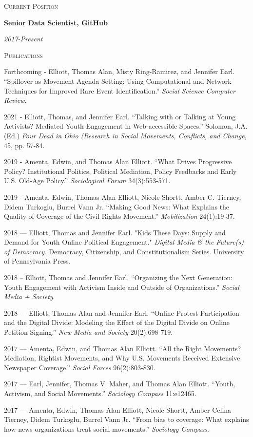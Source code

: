 \documentclass[11pt]{article}
\newcommand{\sectionheader}[1]{
{\Large
\textsc{#1}}
}
\newcommand{\resumeitem}[2]{
\begin{minipage}{0.7\textwidth}
\begin{flushleft}
\textbf{#1}
\end{flushleft}
\end{minipage}
\begin{minipage}{0.3\textwidth}
\begin{flushright}
\emph{#2}
\end{flushright}
\end{minipage}
\hangindent=0.05\textwidth
}
\begin{document}
\sectionheader{Current Position}

\resumeitem{Senior Data Scientist, GitHub}{2017-Present}


\sectionheader{Publications}

Forthcoming - Elliott, Thomas Alan, Misty Ring-Ramirez, and Jennifer Earl. ``Spillover as Movement Agenda Setting: Using Computational and Network Techniques for Improved Rare Event Identification.'' \textit{Social Science Computer Review}.

2021 - Elliott, Thomas, and Jennifer Earl. ``Talking with or Talking at Young Activists? Mediated Youth Engagement in Web-accessible Spaces.'' Solomon, J.A. (Ed.) \textit{Four Dead in Ohio (Research in Social Movements, Conflicts, and Change}, 45, pp. 57-84.

2019 - Amenta, Edwin, and Thomas Alan Elliott. ``What Drives Progressive Policy? Institutional Politics, Political Mediation, Policy Feedbacks and Early U.S. Old-Age Policy.'' \textit{Sociological Forum} 34(3):553-571. 

2019 - Amenta, Edwin, Thomas Alan Elliott, Nicole Shortt, Amber C. Tierney, Didem Turkoglu, Burrel Vann Jr. ``Making Good News: What Explains the Quality of Coverage of the Civil Rights Movement.'' \textit{Mobilization} 24(1):19-37.

2018 --- Elliott, Thomas and Jennifer Earl. "Kids These Days: Supply and Demand for Youth Online Political Engagement." \textit{Digital Media \& the Future(s) of Democracy.} Democracy, Citizenship, and Constitutionalism Series. University of Pennsylvania Press.

2018 -- Elliott, Thomas and Jennifer Earl. ``Organizing the Next Generation: Youth Engagement with Activism Inside and Outside of Organizations.'' \textit{Social Media + Society}.

2018 --- Elliott, Thomas Alan and Jennifer Earl. ``Online Protest Participation and the Digital Divide: Modeling the Effect of the Digital Divide on Online Petition Signing.'' \textit{New Media and Society} 20(2):698-719.

2017 --- Amenta, Edwin, and Thomas Alan Elliott. ``All the Right Movements?
Mediation, Rightist Movements, and Why U.S. Movements Received Extensive Newspaper Coverage.'' \textit{Social Forces} 96(2):803-830. 

2017 --- Earl, Jennifer, Thomas V. Maher, and Thomas Alan Elliott. ``Youth, Activism, and Social Movements.'' \textit{Sociology Compass} 11:e12465.

2017 --- Amenta, Edwin, Thomas Alan Elliott, Nicole Shortt, Amber Celina Tierney, Didem Turkoglu, Burrel Vann Jr. ``From bias to coverage: What explains how news organizations treat social movements.'' \textit{Sociology Compass}. 
\end{document}
